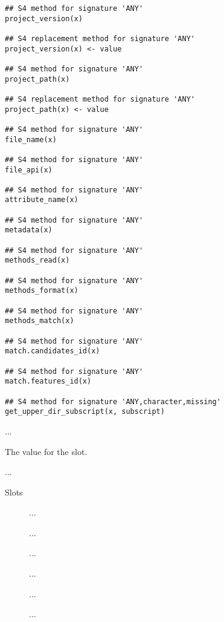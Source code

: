 \documentclass[letterpaper]{book}
\begin{document}
\begin{Usage}
\begin{verbatim}
## S4 method for signature 'ANY'
project_version(x)

## S4 replacement method for signature 'ANY'
project_version(x) <- value

## S4 method for signature 'ANY'
project_path(x)

## S4 replacement method for signature 'ANY'
project_path(x) <- value

## S4 method for signature 'ANY'
file_name(x)

## S4 method for signature 'ANY'
file_api(x)

## S4 method for signature 'ANY'
attribute_name(x)

## S4 method for signature 'ANY'
metadata(x)

## S4 method for signature 'ANY'
methods_read(x)

## S4 method for signature 'ANY'
methods_format(x)

## S4 method for signature 'ANY'
methods_match(x)

## S4 method for signature 'ANY'
match.candidates_id(x)

## S4 method for signature 'ANY'
match.features_id(x)

## S4 method for signature 'ANY,character,missing'
get_upper_dir_subscript(x, subscript)
\end{verbatim}
\end{Usage}
%
\begin{Arguments}
\begin{ldescription}
\item[\code{x}] ...

\item[\code{value}] The value for the slot.

\item[\code{subscript}] ...
\end{ldescription}
\end{Arguments}
%
\begin{Section}{Slots}

\begin{description}

\item[] ...

\item[] ...

\item[] ...

\item[] ...

\item[] ...

\item[] ...

\end{description}
\end{Section}
\end{document}
